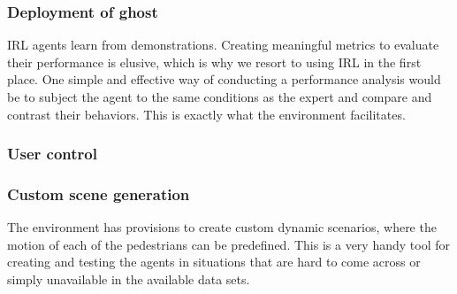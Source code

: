 \subsubsection{Deployment of ghost}
IRL agents learn from demonstrations. Creating meaningful metrics to evaluate their performance is elusive, which is why we resort to using IRL in the first place. One simple and effective way of conducting a performance analysis would be to subject the agent to the same conditions as the expert and compare and contrast their behaviors. This is exactly what the environment facilitates. 

\subsubsection{User control}


\subsubsection{Custom scene generation}
The environment has provisions to create custom dynamic scenarios, where the motion of each of the pedestrians can be predefined. This is a very handy tool for creating and testing the agents in situations that are hard to come across or simply unavailable in the available data sets.\\



